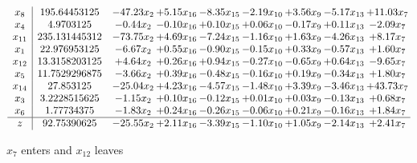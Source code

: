 \documentclass[9pt]{article}
\begin{document}
 \[\begin{array}{c| c c@{\hskip 2pt} c@{\hskip 2pt} c@{\hskip 2pt} c@{\hskip 2pt} c@{\hskip 2pt} c@{\hskip 2pt} c@{\hskip 2pt} }
 x_{8}   &  195.64453125 & -47.23 x_{2} & +  5.15 x_{16} & -8.35 x_{15} & -2.19 x_{10} & +  3.56 x_{9} & -5.17 x_{13} & + 11.03 x_{7}\\
 x_{4}   &  4.9703125 & -0.44 x_{2} & -0.10 x_{16} & +  0.10 x_{15} & +  0.06 x_{10} & -0.17 x_{9} & +  0.11 x_{13} & -2.09 x_{7}\\
 x_{11}   &  235.131445312 & -73.75 x_{2} & +  4.69 x_{16} & -7.24 x_{15} & -1.16 x_{10} & +  1.63 x_{9} & -4.26 x_{13} & +  8.17 x_{7}\\
 x_{1}   &  22.976953125 & -6.67 x_{2} & +  0.55 x_{16} & -0.90 x_{15} & -0.15 x_{10} & +  0.33 x_{9} & -0.57 x_{13} & +  1.60 x_{7}\\
 x_{12}   &  13.3158203125 & +  4.64 x_{2} & +  0.26 x_{16} & +  0.94 x_{15} & -0.27 x_{10} & -0.65 x_{9} & +  0.64 x_{13} & -9.65 x_{7}\\
 x_{5}   &  11.7529296875 & -3.66 x_{2} & +  0.39 x_{16} & -0.48 x_{15} & -0.16 x_{10} & +  0.19 x_{9} & -0.34 x_{13} & +  1.80 x_{7}\\
 x_{14}   &  27.853125 & -25.04 x_{2} & +  4.23 x_{16} & -4.57 x_{15} & -1.48 x_{10} & +  3.39 x_{9} & -3.46 x_{13} & + 43.73 x_{7}\\
 x_{3}   &  3.2228515625 & -1.15 x_{2} & +  0.10 x_{16} & -0.12 x_{15} & +  0.01 x_{10} & +  0.03 x_{9} & -0.13 x_{13} & +  0.68 x_{7}\\
 x_{6}   &  1.77734375 & -1.83 x_{2} & +  0.24 x_{16} & -0.26 x_{15} & -0.06 x_{10} & +  0.21 x_{9} & -0.16 x_{13} & +  1.84 x_{7}\\
\hline
z    &  92.75390625 & -25.55 x_{2} & +  2.11 x_{16} & -3.39 x_{15} & -1.10 x_{10} & +  1.05 x_{9} & -2.14 x_{13} & +  2.41 x_{7}\\
\end{array}\]


 $ x_{7} $ enters and $ x_{12} $ leaves 
\end{document}
